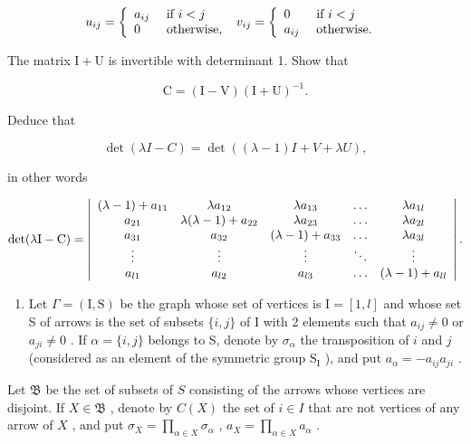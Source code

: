 \[
u _ {i j} = \left\{ \begin{array}{l l} a _ {i j} & \text { if } i <   j \\ 0 & \text { otherwise, } \end{array} \right. v _ {i j} = \left\{ \begin{array}{l l} 0 & \text { if } i <   j \\ a _ {i j} & \text { otherwise. } \end{array} \right.
\]

The matrix \(\mathrm{I} + \mathrm{U}\) is invertible with determinant 1. Show that

\[
\mathrm{C} = (\mathrm{I} - \mathrm{V}) (\mathrm{I} + \mathrm{U}) ^ {- 1}.
\]

Deduce that

\[
\det (\lambda I - C) = \det ((\lambda - 1) I + V + \lambda U),
\]

in other words

\[
\det (\lambda \mathrm{I} - \mathrm{C}) = \left| \begin{array}{c c c c c} (\lambda - 1) + a _ {1 1} & \lambda a _ {1 2} & \lambda a _ {1 3} & \dots & \lambda a _ {1 l} \\ a _ {2 1} & \lambda (\lambda - 1) + a _ {2 2} & \lambda a _ {2 3} & \dots & \lambda a _ {2 l} \\ a _ {3 1} & a _ {3 2} & (\lambda - 1) + a _ {3 3} & \dots & \lambda a _ {3 l} \\ \vdots & \vdots & \vdots & \ddots & \vdots \\ a _ {l 1} & a _ {l 2} & a _ {l 3} & \dots & (\lambda - 1) + a _ {l l} \end{array} \right|.
\]

\begin{enumerate}
\def\labelenumi{\alph{enumi})}
\setcounter{enumi}{2}
\tightlist
\item
  Let \(\Gamma = (\mathrm{I},\mathrm{S})\) be the graph whose set of vertices is \(\mathrm{I} = [1,l]\) and whose set S of arrows is the set of subsets \(\{i,j\}\) of I with 2 elements such that \(a_{ij}\neq 0\) or \(a_{ji}\neq 0\) . If \(\alpha = \{i,j\}\) belongs to S, denote by \(\sigma_{\alpha}\) the transposition of \(i\) and \(j\) (considered as an element of the symmetric group \(\mathrm{S_I}\) ), and put \(a_{\alpha} = -a_{ij}a_{ji}\) .
\end{enumerate}

Let \(\mathfrak{B}\) be the set of subsets of \(S\) consisting of the arrows whose vertices are disjoint. If \(X \in \mathfrak{B}\) , denote by \(C(X)\) the set of \(i \in I\) that are not vertices of any arrow of \(X\) , and put \(\sigma_X = \prod_{\alpha \in X} \sigma_\alpha\) , \(a_X = \prod_{\alpha \in X} a_\alpha\) .

